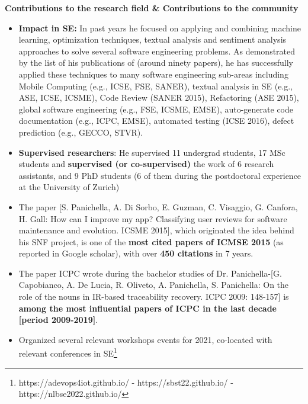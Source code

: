 \documentclass[11pt]{article}
\begin{document}
\textbf{Contributions to the research field \& Contributions to the community}
\vspace{-2.5mm}
\begin{itemize}
\item \textbf{Impact in SE:} In past years he focused on applying and combining machine learning, optimization techniques, textual analysis and sentiment analysis approaches to solve several software engineering problems. As demonstrated by the list of his publications of (around ninety papers), he has successfully applied these techniques to many software engineering sub-areas including Mobile Computing (e.g., ICSE, FSE, SANER), textual analysis in SE (e.g., ASE, ICSE, ICSME), Code Review (SANER 2015), Refactoring (ASE 2015), global software engineering (e.g., FSE, ICSME, EMSE), auto-generate code documentation (e.g., ICPC, EMSE), automated testing (ICSE 2016), defect prediction (e.g., GECCO, STVR). 
  \vspace{-2mm}
  \item 
  \textbf{Supervised researchers}: He supervised 11 undergrad students, 17 MSc students and \textbf{supervised (or co-supervised)} the work of 6 research assistants, and 9 PhD students (6 of them during the postdoctoral experience at the University of Zurich)
  \vspace{-2mm} 
 \item The paper [S. Panichella, A. Di Sorbo, E. Guzman, C. Visaggio, G. Canfora, H. Gall: How can I improve my app? Classifying user reviews for software maintenance and evolution. ICSME 2015], which originated the idea behind his SNF project, is one of the \textbf{most cited papers of ICMSE 2015} (as reported in Google scholar), with over \textbf{450 citations} in 7 years.   
 \vspace{-2mm}
  \item The paper ICPC wrote during the bachelor studies of Dr. Panichella-[G. Capobianco, A. De Lucia, R. Oliveto, A. Panichella, S. Panichella: On the role of the nouns in IR-based traceability recovery. ICPC 2009: 148-157] is \textbf{among the most influential papers of ICPC in the last decade [period 2009-2019]}.
  \vspace{-2mm}
 \item Organized several relevant workshops events for 2021, co-located with relevant conferences in SE\footnote{https://adevops4iot.github.io/
-	https://sbst22.github.io/
-	https://nlbse2022.github.io/}
  \vspace{-2mm}
\end{itemize}
\end{document}
